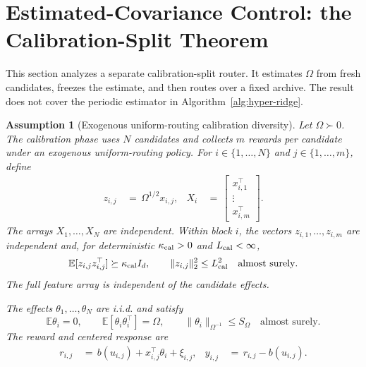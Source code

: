 \documentclass{article} %
\newtheorem{assumption}{Assumption}
\begin{document}
\section{Estimated-Covariance Control: the Calibration-Split Theorem}
\label{app:err-control-proof}

This section analyzes a separate calibration-split router. It estimates
\(\Omega\) from fresh candidates, freezes the estimate, and then routes over a
fixed archive. The result does not cover the periodic estimator in
Algorithm~\ref{alg:hyper-ridge}.

\begin{assumption}[Exogenous uniform-routing calibration diversity]
\label{ass:exogenous-uniform-calibration-diversity-final}
Let \(\Omega\succ0\). The calibration phase uses \(N\) candidates and collects
\(m\) rewards per candidate under an exogenous uniform-routing policy. For
\(i\in\{1,\ldots,N\}\) and \(j\in\{1,\ldots,m\}\), define
\begin{equation}
\begin{aligned}
z_{i,j}
&\,=\,
\Omega^{1/2}x_{i,j},
&
X_i
&\,=\,
\begin{bmatrix}
x_{i,1}^{\top}\\
\vdots\\
x_{i,m}^{\top}
\end{bmatrix}.
\end{aligned}
\end{equation}
The arrays \(X_1,\ldots,X_N\) are independent. Within block \(i\), the
vectors \(z_{i,1},\ldots,z_{i,m}\) are independent and, for deterministic
\(\kappa_{\rm cal}>0\) and \(L_{\rm cal}<\infty\),
\begin{equation}
\mathbb E[z_{i,j}z_{i,j}^{\top}]
\succeq\kappa_{\rm cal}I_d,
\qquad
\|z_{i,j}\|_2^2\leq L_{\rm cal}^2
\quad\text{almost surely}.
\end{equation}
The full feature array is independent of the candidate effects.

The effects \(\theta_1,\ldots,\theta_N\) are i.i.d. and satisfy
\begin{equation}
\mathbb E\theta_i=0,
\qquad
\mathbb E[\theta_i\theta_i^\top]=\Omega,
\qquad
\|\theta_i\|_{\Omega^{-1}}\leq S_\Omega
\quad\text{almost surely}.
\end{equation}
The reward and centered response are
\begin{equation}
\begin{aligned}
r_{i,j}
&\,=\,
b(u_{i,j})+x_{i,j}^{\top}\theta_i+\xi_{i,j},
&
y_{i,j}
&\,=\,
r_{i,j}-b(u_{i,j}).
\end{aligned}
\end{equation}


\end{assumption}
\end{document}
